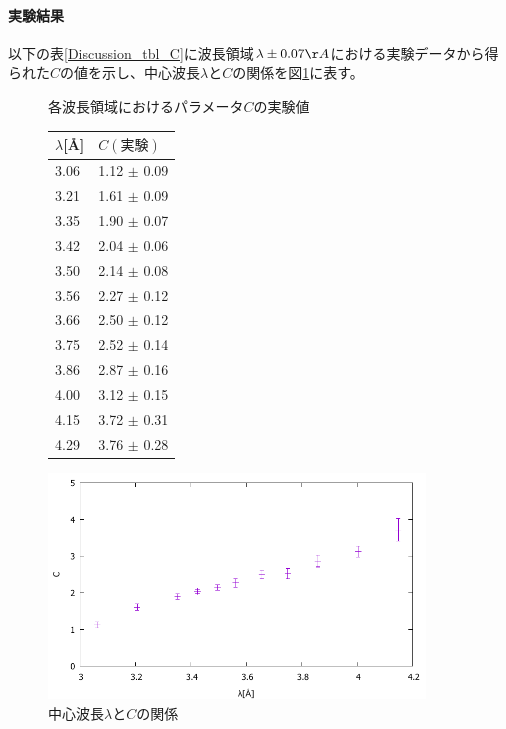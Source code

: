 \paragraph{実験結果}
以下の表\ref{Discussion_tbl_C}に波長領域$\lambda \pm 0.07 \AA$における実験データから得られた$C$の値を示し、中心波長$\lambda$と$C$の関係を図\ref{Discussion_fig_C}に表す。
\begin{figure}[h]
\begin{minipage}{0.35\hsize}
\centering
\makeatletter
\def\@captype{table}
\makeatother
\caption{各波長領域におけるパラメータ$C$の実験値} \label{Discussion_tbl_C}
\begin{tabular}{ll}
$\lambda$[\AA] &  $C(実験)$\\ \hline
3.06 	&	1.12 	$\pm$	0.09 \\
3.21 	&	1.61 	$\pm$	0.09 \\
3.35 	&	1.90 	$\pm$	0.07 \\
3.42 	&	2.04 	$\pm$	0.06 \\
3.50 	&	2.14 	$\pm$	0.08 \\
3.56 	&	2.27 	$\pm$	0.12 \\
3.66 	&	2.50 	$\pm$	0.12 \\
3.75 	&	2.52 	$\pm$	0.14 \\
3.86 	&	2.87 	$\pm$	0.16 \\
4.00 	&	3.12 	$\pm$	0.15 \\
4.15 	&	3.72 	$\pm$	0.31 \\
4.29 	&	3.76 	$\pm$	0.28 \\ \hline
\end{tabular}
\end{minipage}
\begin{minipage}{0.65\hsize}
\centering
\vspace{2.5cm}
\includegraphics[width=10cm]{discussion/C/C_F.pdf}
\caption{中心波長$\lambda$と$C$の関係} \label{Discussion_fig_C}
\end{minipage}
\end{figure}

